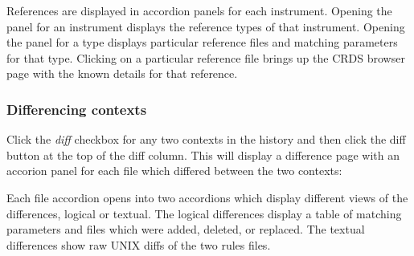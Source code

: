 \documentclass[letterpaper,10pt,english]{sphinxmanual}
\begin{document}
References are displayed in accordion panels for each instrument.   Opening the panel for
an instrument displays the reference types of that instrument.  Opening the panel for a type
displays particular reference files and matching parameters for that type.   Clicking on a particular
reference file brings up the CRDS browser page with the known details for that reference.


\subsubsection{Differencing contexts}
\label{web_site_use:differencing-contexts}
Click the \emph{diff} checkbox for any two contexts in the history and then click the diff button
at the top of the diff column.   This will display a difference page with an accorion panel
for each file which differed between the two contexts:
\begin{figure}[htbp]
\centering

\end{figure}

Each file accordion opens into two accordions which display different views of the differences,
logical or textual.  The logical differences display a table of matching parameters and files
which were added, deleted, or replaced.   The textual differences show raw UNIX diffs of the
two rules files.
\end{document}
